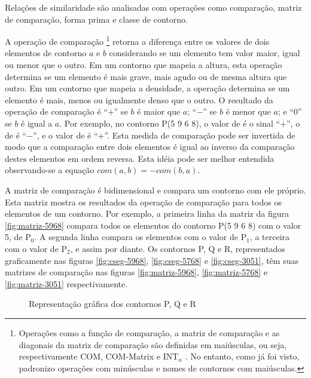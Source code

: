 Relações de similaridade \cite{marvin.ea87:relating} são analisadas
com operações como comparação, matriz de comparação, forma prima e
classe de contorno.

A operação de comparação \footnote{Operações como a
  função de comparação, a matriz de comparação e as diagonais da
  matriz de comparação são definidas em maiúsculas, ou seja,
  respectivamente COM, COM-Matrix e INT$_n$
  \cite{morris87:composition}. No entanto, como já foi visto,
  padronizo operações com minúsculas e nomes de contornos com
  maiúsculas.} retorna a diferença entre os valores de dois elementos
de contorno $a$ e $b$ considerando se um elemento tem valor maior,
igual ou menor que o outro. Em um contorno que mapeia a altura, esta
operação determina se um elemento é mais grave, mais agudo ou de mesma
altura que outro. Em um contorno que mapeia a densidade, a operação
determina se um elemento é mais, menos ou igualmente denso que o
outro. O resultado da operação de comparação é ``$+$'' se $b$ é maior
que $a$; ``$-$'' se $b$ é menor que $a$; e ``$0$'' se $b$ é igual a
$a$. Por exemplo, no contorno P(5 9 6 8), o valor de
 é o sinal ``$+$'', o de
 é ``$-$'', e o valor de
 é ``$+$''. Esta medida de comparação pode ser
invertida de modo que a comparação entre dois elementos é igual ao
inverso da comparação destes elementos em ordem reversa. Esta idéia
pode ser melhor entendida observando-se a equação
$com(a,b)=-com(b,a)$.

A matriz de comparação é bidimensional e compara um contorno com ele
próprio. Esta matriz mostra os resultados da operação de comparação
para todos os elementos de um contorno. Por exemplo, a primeira linha
da matriz da figura \ref{fig:matriz-5968} compara todos os elementos
do contorno P(5 9 6 8) com o valor 5, de P$_0$. A segunda linha
compara os elementos com o valor de P$_1$, a terceira com o valor de
P$_2$, e assim por diante. Os contornos P, Q e R, representados
graficamente nas figuras \ref{fig:cseg-5968}, \ref{fig:cseg-5768} e
\ref{fig:cseg-3051}, têm suas matrizes de comparação nas figuras
\ref{fig:matriz-5968}, \ref{fig:matriz-5768} e \ref{fig:matriz-3051}
respectivamente.

\begin{figure}
  \centering
  \subfloat[contorno P(5 9 6 8)]{
    \texttt{[image: c-5968]}
    \label{fig:cseg-5968}
  }
  \subfloat[contorno Q(5 7 6 8)]{
    \texttt{[image: c-5768]}
    \label{fig:cseg-5768}
  }
  \subfloat[contorno R(3 0 5 1)]{
    \texttt{[image: c-3051]}
    \label{fig:cseg-3051}
  }
  \caption{Representação gráfica dos contornos P, Q e R}
  \label{fig:repr-grafica-pqr}
\end{figure}

